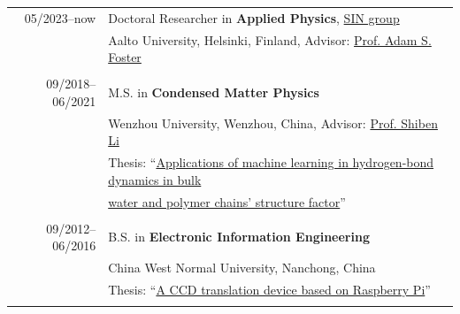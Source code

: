 \documentclass[a4paper,10pt]{article} %
\begin{document}
\begin{tabular}{r|l}	
05/2023--now 				    & Doctoral Researcher in \textbf{Applied Physics}, \href{https://www.aalto.fi/en/department-of-applied-physics/surfaces-and-interfaces-at-the-nanoscale-sin}{SIN group}\\
& Aalto University, Helsinki, Finland, Advisor: \href{https://scholar.google.fi/citations?user=I0n9QYcAAAAJ}{Prof. Adam S. Foster}\\
\multicolumn{2}{c}{} \\	%

09/2018--06/2021 				    & M.S. in \textbf{Condensed Matter Physics}\\
                                    & Wenzhou University, Wenzhou, China, Advisor: \href{https://slxy.wzu.edu.cn/lishiben.pdf}{Prof. Shiben Li}\\
                                    & Thesis: “\href{https://way2ml.github.io/_static/cv/2021_07_24_12_HuangJieBiYeDaBian.pdf}{Applications of machine learning in hydrogen-bond dynamics in bulk} \\& \href{https://way2ml.github.io/_static/cv/2021_07_24_12_HuangJieBiYeDaBian.pdf}{water and polymer chains’ structure factor}”\\

%


\multicolumn{2}{c}{} \\	%

09/2012--06/2016                    & B.S. in \textbf{Electronic Information Engineering} \\                    & China West Normal University, Nanchong, China\\
					 & Thesis: “\href{https://way2ml.github.io/_static/cv/2021_07_24_13_CCD_translation_device.pdf}{A CCD translation device based on Raspberry Pi}”	\\
\multicolumn{2}{c}{} \\	%
\end{tabular}
\end{document}
